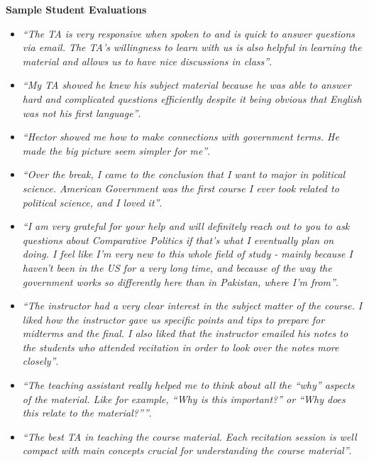 \documentclass[11pt]{letter} %
\begin{document}
\begin{letter}{}
{\bf Sample Student Evaluations}

\begin{itemize}

\item \emph{``The TA is very responsive when spoken to and is quick to answer questions via email. The TA's willingness to learn with us is also helpful in learning the material and allows us to have nice discussions in class''}.

\item \emph{``My TA showed he knew his subject material because he was able to answer hard and complicated questions efficiently despite it being obvious that English was not his first language''}.

\item \emph{``Hector showed me how to make connections with government terms. He made the big picture seem simpler for me''}.

\item \emph{``Over the break, I came to the conclusion that I want to major in political science. American Government was the first course I ever took related to political science, and I loved it''}.

\item \emph{``I am very grateful for your help and will definitely reach out to you to ask questions about Comparative Politics if that's what I eventually plan on doing. I feel like I'm very new to this whole field of study - mainly because I haven't been in the US for a very long time, and because of the way the government works so differently here than in Pakistan, where I'm from''}.

\item \emph{``The instructor had a very clear interest in the subject matter of the course. I liked how the instructor gave us specific points and tips to prepare for midterms and the final. I also liked that the instructor emailed his notes to the students who attended recitation in order to look over the notes more closely''}.

\item \emph{``The teaching assistant really helped me to think about all the ``why'' aspects of the material. Like for example, ``Why is this important?'' or ``Why does this relate to the material?''''}.

\item \emph{``The best TA in teaching the course material. Each recitation session is well compact with main concepts crucial for understanding the course material''}.


\end{itemize}
\end{letter}
\end{document}
